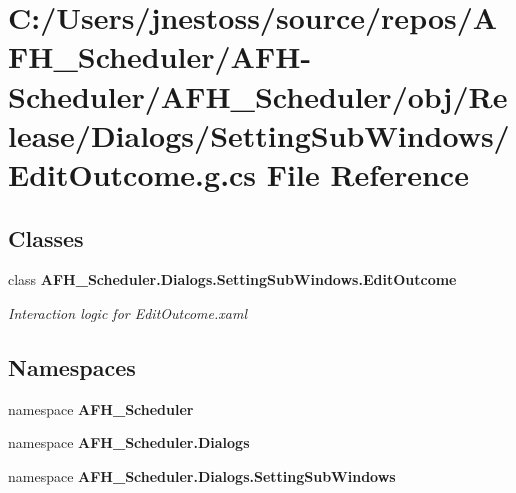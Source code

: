 \section{C\+:/\+Users/jnestoss/source/repos/\+A\+F\+H\+\_\+\+Scheduler/\+A\+F\+H-\/\+Scheduler/\+A\+F\+H\+\_\+\+Scheduler/obj/\+Release/\+Dialogs/\+Setting\+Sub\+Windows/\+Edit\+Outcome.g.\+cs File Reference}
\label{_release_2_dialogs_2_setting_sub_windows_2_edit_outcome_8g_8cs}
\subsection*{Classes}
\begin{DoxyCompactItemize}
\item 
class \textbf{ A\+F\+H\+\_\+\+Scheduler.\+Dialogs.\+Setting\+Sub\+Windows.\+Edit\+Outcome}
\begin{DoxyCompactList}\small\item\em Interaction logic for Edit\+Outcome.\+xaml \end{DoxyCompactList}\end{DoxyCompactItemize}
\subsection*{Namespaces}
\begin{DoxyCompactItemize}
\item 
namespace \textbf{ A\+F\+H\+\_\+\+Scheduler}
\item 
namespace \textbf{ A\+F\+H\+\_\+\+Scheduler.\+Dialogs}
\item 
namespace \textbf{ A\+F\+H\+\_\+\+Scheduler.\+Dialogs.\+Setting\+Sub\+Windows}
\end{DoxyCompactItemize}
